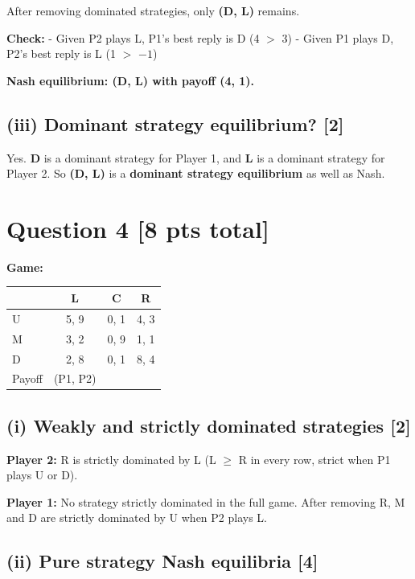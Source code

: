 \documentclass[
]{article}
\newcounter{none} %
\begin{document}
After removing dominated strategies, only \textbf{(D, L)} remains.

\textbf{Check:} - Given P2 plays L, P1's best reply is D (4 \(>\) 3) -
Given P1 plays D, P2's best reply is L (1 \(>\) \(-1\))

\textbf{Nash equilibrium: (D, L) with payoff (4, 1).}

\subsection{(iii) Dominant strategy equilibrium?
{[}2{]}}\label{iii-dominant-strategy-equilibrium-2}

Yes. \textbf{D} is a dominant strategy for Player 1, and \textbf{L} is a
dominant strategy for Player 2. So \textbf{(D, L)} is a \textbf{dominant
strategy equilibrium} as well as Nash.

\newpage

\section{Question 4 {[}8 pts total{]}}\label{question-4-8-pts-total}

\textbf{Game:}

{\def\LTcaptype{none} %
\begin{longtable}[]{@{}lccc@{}}
\toprule\noalign{}
& L & C & R \\
\midrule\noalign{}
\endhead
\bottomrule\noalign{}
\endlastfoot
U & 5, 9 & 0, 1 & 4, 3 \\
M & 3, 2 & 0, 9 & 1, 1 \\
D & 2, 8 & 0, 1 & 8, 4 \\
Payoff & (P1, P2) & & \\
\end{longtable}
}

\subsection{(i) Weakly and strictly dominated strategies
{[}2{]}}\label{i-weakly-and-strictly-dominated-strategies-2}

\textbf{Player 2:} R is strictly dominated by L (L \(\geq\) R in every
row, strict when P1 plays U or D).

\textbf{Player 1:} No strategy strictly dominated in the full game.
After removing R, M and D are strictly dominated by U when P2 plays L.

\subsection{(ii) Pure strategy Nash equilibria
{[}4{]}}\label{ii-pure-strategy-nash-equilibria-4}
\end{document}
